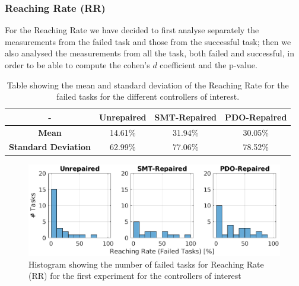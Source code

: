 \subsubsection{Reaching Rate (RR)}\label{subsub:first-RR}
For the Reaching Rate we have decided to first analyse separately the measurements from the failed task and those from the successful task; then we also analysed the measurements from all the task, both failed and successful, in order to be able to compute the cohen's $d$ coefficient and the p-value.
%
%
\begin{table}[ht]
    \centering
    \begin{tabular}{|c|c|c|c|}
        \hline
        - & \textbf{Unrepaired} & \textbf{SMT-Repaired} & \textbf{PDO-Repaired} \\
        \hline
        \textbf{Mean} & 14.61\% & 31.94\% & 30.05\% \\
        \textbf{Standard Deviation} & 62.99\% & 77.06\% & 78.52\% \\
        \hline
    \end{tabular}
    \caption{Table showing the mean and standard deviation of the Reaching Rate for the failed tasks for the different controllers of interest.}
    \label{tab:RR-fail-first-mean-std}
\end{table}
\begin{figure}[ht]
    \centering
    \includegraphics[width=\textwidth]{Images/first-experiment/exp0_RR_fail_hist.eps}
    \caption{Histogram showing the number of failed tasks for Reaching Rate (RR) for the first experiment for the controllers of interest}
    \label{fig:hist-RR-fail-first}
\end{figure}
